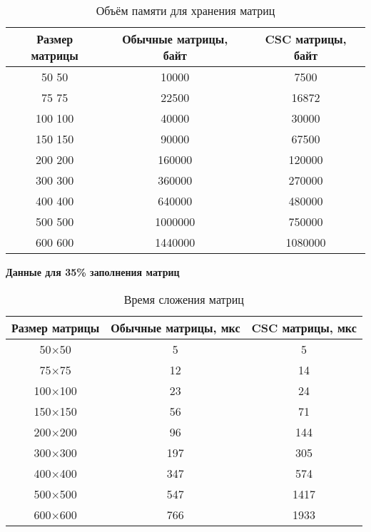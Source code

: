 \begin{table}[H]
	\centering
	\caption{Объём памяти для хранения матриц}
	\begin{tabular}{|c|c|c|}
		\hline
		Размер матрицы & Обычные матрицы, байт & CSC матрицы, байт \\ \hline
		50  50         & 10000                 & 7500             \\ \hline
		75  75         & 22500                 & 16872             \\ \hline
		100 100        & 40000                 & 30000             \\ \hline
		150 150        & 90000                 & 67500            \\ \hline
		200 200        & 160000                & 120000            \\ \hline
		300 300        & 360000                & 270000            \\ \hline
		400 400        & 640000                & 480000           \\ \hline
		500 500        & 1000000               & 750000           \\ \hline
		600 600        & 1440000               & 1080000           \\ \hline
	\end{tabular}
\end{table}


\newpage
\textbf{Данные для 35\% заполнения матриц}
\begin{table}[H]
	\centering
	\caption{Время сложения матриц}
	\begin{tabular}{|c|c|c|}
		\hline
		Размер матрицы & Обычные матрицы, мкс & CSC матрицы, мкс \\ \hline
		50$\times$50         & 5                    & 5                \\ \hline
		75$\times$75         & 12                   & 14                \\ \hline
		100$\times$100        & 23                   & 24                \\ \hline
		150$\times$150        & 56                   & 71               \\ \hline
		200$\times$200        & 96                   & 144               \\ \hline
		300$\times$300        & 197                  & 305               \\ \hline
		400$\times$400        & 347                  & 574              \\ \hline
		500$\times$500        & 547                  & 1417              \\ \hline
		600$\times$600        & 766                  & 1933              \\ \hline
	\end{tabular}
\end{table}

